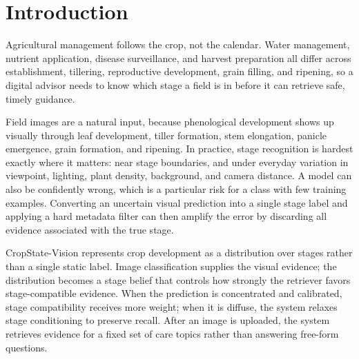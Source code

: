\documentclass[conference]{IEEEtran}
\begin{document}
\section{Introduction}

Agricultural management follows the crop, not the calendar. Water management, nutrient application, disease surveillance, and harvest preparation all differ across establishment, tillering, reproductive development, grain filling, and ripening, so a digital advisor needs to know which stage a field is in before it can retrieve safe, timely guidance.

Field images are a natural input, because phenological development shows up visually through leaf development, tiller formation, stem elongation, panicle emergence, grain formation, and ripening. In practice, stage recognition is hardest exactly where it matters: near stage boundaries, and under everyday variation in viewpoint, lighting, plant density, background, and camera distance. A model can also be confidently wrong, which is a particular risk for a class with few training examples. Converting an uncertain visual prediction into a single stage label and applying a hard metadata filter can then amplify the error by discarding all evidence associated with the true stage.

CropState-Vision represents crop development as a distribution over stages rather than a single static label. Image classification supplies the visual evidence; the distribution becomes a stage belief that controls how strongly the retriever favors stage-compatible evidence. When the prediction is concentrated and calibrated, stage compatibility receives more weight; when it is diffuse, the system relaxes stage conditioning to preserve recall. After an image is uploaded, the system retrieves evidence for a fixed set of care topics rather than answering free-form questions.
\end{document}
